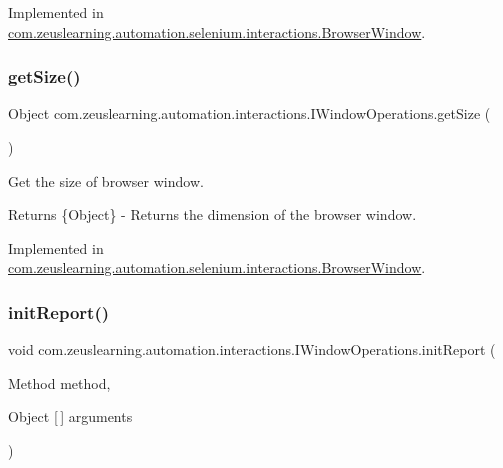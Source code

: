 Implemented in \hyperlink{classcom_1_1zeuslearning_1_1automation_1_1selenium_1_1interactions_1_1BrowserWindow_a0b6b11b00f45f4b78455962d6b33b33f}{com.\+zeuslearning.\+automation.\+selenium.\+interactions.\+Browser\+Window}.

\hypertarget{interfacecom_1_1zeuslearning_1_1automation_1_1interactions_1_1IWindowOperations_a686ed29895edf5c89045fff9329b83f4}{}\label{interfacecom_1_1zeuslearning_1_1automation_1_1interactions_1_1IWindowOperations_a686ed29895edf5c89045fff9329b83f4} 
\subsubsection{\texorpdfstring{get\+Size()}{getSize()}}
{\footnotesize\ttfamily Object com.\+zeuslearning.\+automation.\+interactions.\+I\+Window\+Operations.\+get\+Size (\begin{DoxyParamCaption}{ }\end{DoxyParamCaption})}

Get the size of browser window.

\begin{DoxyReturn}{Returns}
\{Object\} -\/ Returns the dimension of the browser window. 
\end{DoxyReturn}


Implemented in \hyperlink{classcom_1_1zeuslearning_1_1automation_1_1selenium_1_1interactions_1_1BrowserWindow_a018371a31ff443e6e1c192862b1a8a29}{com.\+zeuslearning.\+automation.\+selenium.\+interactions.\+Browser\+Window}.

\hypertarget{interfacecom_1_1zeuslearning_1_1automation_1_1interactions_1_1IWindowOperations_ab0718c55083800157948949414d2a8d8}{}\label{interfacecom_1_1zeuslearning_1_1automation_1_1interactions_1_1IWindowOperations_ab0718c55083800157948949414d2a8d8} 
\subsubsection{\texorpdfstring{init\+Report()}{initReport()}}
{\footnotesize\ttfamily void com.\+zeuslearning.\+automation.\+interactions.\+I\+Window\+Operations.\+init\+Report (\begin{DoxyParamCaption}\item[{Method}]{method,  }\item[{Object \mbox{[}$\,$\mbox{]}}]{arguments }\end{DoxyParamCaption})}


